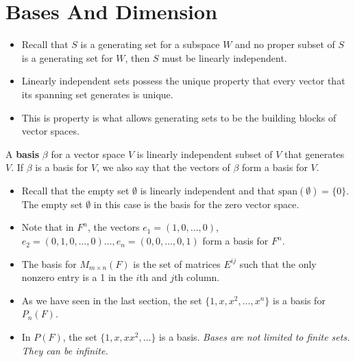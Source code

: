\section{Bases And Dimension}

\begin{itemize}
    \item Recall that \( S  \) is a generating set for a subspace \( W  \) and no proper subset of \( S  \) is a generating set for \( W  \), then \( S  \) must be linearly independent. 
    \item Linearly independent sets possess the unique property that every vector that its spanning set generates is unique.
    \item This is property is what allows generating sets to be the building blocks of vector spaces.
\end{itemize}

\begin{definition}[Basis]
    A \textbf{basis} \( \beta \) for a vector space \( V  \) is linearly independent subset of \( V  \) that generates \( V  \). If \( \beta  \) is a basis for \( V  \), we also say that the vectors of \( \beta \) form a basis for \( V  \).
\end{definition}

\begin{eg}
    \begin{itemize}
        \item     Recall that the empty set \( \emptyset \) is linearly independent and that \( \text{span}(\emptyset) = \{ 0 \}  \). The empty set \( \emptyset \) in this case is the basis for the zero vector space.
        \item Note that in \( F^{n}  \), the vectors \( e_{1} = (1,0, \dots, 0 ) \), \( e_{2} = (0,1,0, \dots, 0 ) \dots, e_{n} = (0,0, \dots, 0, 1 ) \) form a basis for \( F^{n} \).
        \item The basis for \( M_{m \times n}(F ) \) is the set of matrices \( E^{ij} \) such that the only nonzero entry is a 1 in the \( i \)th and \( j \)th column.
        \item As we have seen in the last section, the set \( \{ 1, x , x^{2}, \dots, x^{n} \}  \) is a basis for \( P_{n}(F) \).
        \item In \( P(F) \), the set \( \{ 1,x ,x x^{2}, \dots \}  \) is a basis. \textit{Bases are not limited to finite sets. They can be infinite.} 
\end{itemize}
\end{eg}

